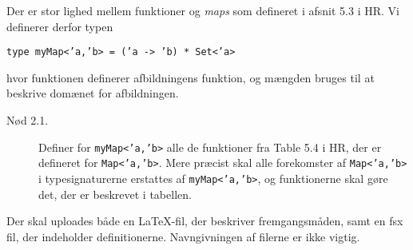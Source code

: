\documentclass[a4paper]{article}
\begin{document}
Der er stor lighed mellem funktioner og \emph{maps} som defineret i
afsnit 5.3 i HR.  Vi definerer derfor typen

\vspace{1ex}

\texttt{type myMap<'a,'b> = ('a -> 'b) * Set<'a>}

\vspace{1ex}

\noindent
hvor funktionen definerer afbildningens funktion, og mængden bruges
til at beskrive domænet for afbildningen.

\begin{description}

\item[Nød 2.1.] Definer for \texttt{myMap<'a,'b>} alle de funktioner
  fra Table 5.4 i HR, der er defineret for \texttt{Map<'a,'b>}.  Mere
  præcist skal alle forekomster af \texttt{Map<'a,'b>} i
  typesignaturerne erstattes af \texttt{myMap<'a,'b>}, og funktionerne
  skal gøre det, der er beskrevet i tabellen.

\end{description}

\noindent
Der skal uploades både en \LaTeX-fil, der beskriver fremgangsmåden,
samt en fsx fil, der indeholder definitionerne.  Navngivningen af
filerne er ikke vigtig.
\end{document}
